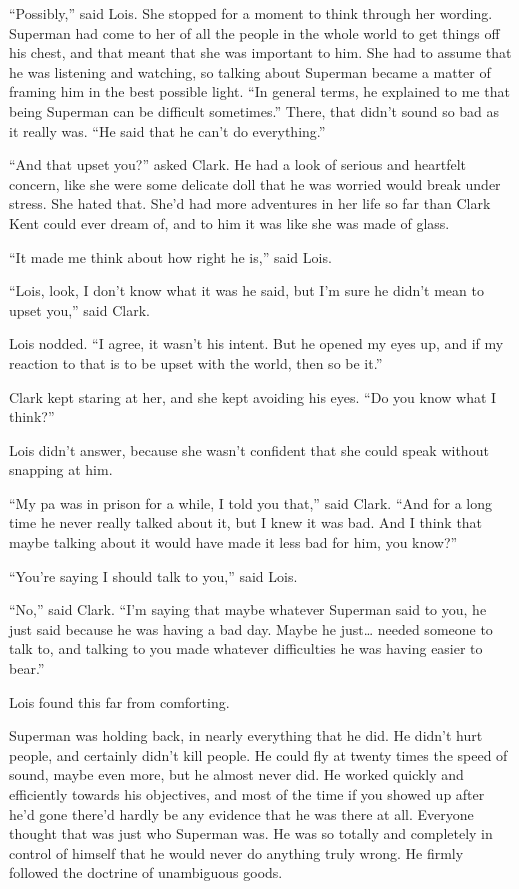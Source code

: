 ``Possibly,'' said Lois. She stopped for a moment to think through her
wording. Superman had come to her of all the people in the whole world
to get things off his chest, and that meant that she was important to
him. She had to assume that he was listening and watching, so talking
about Superman became a matter of framing him in the best possible
light. ``In general terms, he explained to me that being Superman can be
difficult sometimes.'' There, that didn't sound so bad as it really was.
``He said that he can't do everything.''

``And that upset you?'' asked Clark. He had a look of serious and
heartfelt concern, like she were some delicate doll that he was worried
would break under stress. She hated that. She'd had more adventures in
her life so far than Clark Kent could ever dream of, and to him it was
like she was made of glass.

``It made me think about how right he is,'' said Lois.

``Lois, look, I don't know what it was he said, but I'm sure he didn't
mean to upset you,'' said Clark.

Lois nodded. ``I agree, it wasn't his intent. But he opened my eyes up,
and if my reaction to that is to be upset with the world, then so be
it.''

Clark kept staring at her, and she kept avoiding his eyes. ``Do you know
what I think?''

Lois didn't answer, because she wasn't confident that she could speak
without snapping at him.

``My pa was in prison for a while, I told you that,'' said Clark. ``And
for a long time he never really talked about it, but I knew it was bad.
And I think that maybe talking about it would have made it less bad for
him, you know?''

``You're saying I should talk to you,'' said Lois.

``No,'' said Clark. ``I'm saying that maybe whatever Superman said to
you, he just said because he was having a bad day. Maybe he just\ldots{}
needed someone to talk to, and talking to you made whatever difficulties
he was having easier to bear.''

Lois found this far from comforting.

Superman was holding back, in nearly everything that he did. He didn't
hurt people, and certainly didn't kill people. He could fly at twenty
times the speed of sound, maybe even more, but he almost never did. He
worked quickly and efficiently towards his objectives, and most of the
time if you showed up after he'd gone there'd hardly be any evidence
that he was there at all. Everyone thought that was just who Superman
was. He was so totally and completely in control of himself that he
would never do anything truly wrong. He firmly followed the doctrine of
unambiguous goods.

